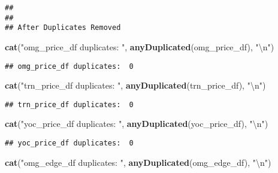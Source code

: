 \documentclass[]{article}
\newenvironment{Shaded}{\begin{snugshade}}{\end{snugshade}}
\newcommand{\KeywordTok}[1]{\textcolor[rgb]{0.13,0.29,0.53}{\textbf{#1}}}
\newcommand{\CharTok}[1]{\textcolor[rgb]{0.31,0.60,0.02}{#1}}
\newcommand{\StringTok}[1]{\textcolor[rgb]{0.31,0.60,0.02}{#1}}
\newcommand{\NormalTok}[1]{#1}
\begin{document}
\begin{verbatim}
## 
## 
## After Duplicates Removed
\end{verbatim}

\begin{Shaded}
\begin{Highlighting}[]
\KeywordTok{cat}\NormalTok{(}\StringTok{"omg_price_df duplicates: "}\NormalTok{, }\KeywordTok{anyDuplicated}\NormalTok{(omg_price_df), }\StringTok{"}\CharTok{\textbackslash{}n}\StringTok{"}\NormalTok{)}
\end{Highlighting}
\end{Shaded}

\begin{verbatim}
## omg_price_df duplicates:  0
\end{verbatim}

\begin{Shaded}
\begin{Highlighting}[]
\KeywordTok{cat}\NormalTok{(}\StringTok{"trn_price_df duplicates: "}\NormalTok{, }\KeywordTok{anyDuplicated}\NormalTok{(trn_price_df), }\StringTok{"}\CharTok{\textbackslash{}n}\StringTok{"}\NormalTok{)}
\end{Highlighting}
\end{Shaded}

\begin{verbatim}
## trn_price_df duplicates:  0
\end{verbatim}

\begin{Shaded}
\begin{Highlighting}[]
\KeywordTok{cat}\NormalTok{(}\StringTok{"yoc_price_df duplicates: "}\NormalTok{, }\KeywordTok{anyDuplicated}\NormalTok{(yoc_price_df), }\StringTok{"}\CharTok{\textbackslash{}n}\StringTok{"}\NormalTok{)}
\end{Highlighting}
\end{Shaded}

\begin{verbatim}
## yoc_price_df duplicates:  0
\end{verbatim}

\begin{Shaded}
\begin{Highlighting}[]
\KeywordTok{cat}\NormalTok{(}\StringTok{"omg_edge_df  duplicates: "}\NormalTok{, }\KeywordTok{anyDuplicated}\NormalTok{(omg_edge_df), }\StringTok{"}\CharTok{\textbackslash{}n}\StringTok{"}\NormalTok{)}
\end{Highlighting}
\end{Shaded}
\end{document}
